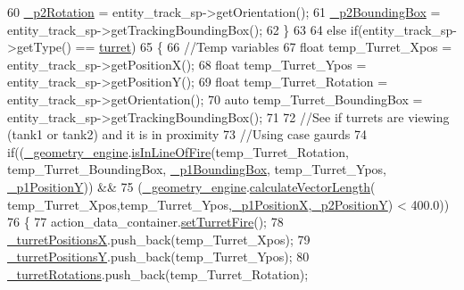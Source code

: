\begin{DoxyCode}
60                 \hyperlink{classTrackingManager_a04442a7d5e399370637c9e334a257eb6}{\_p2Rotation} = entity\_track\_sp->getOrientation();
61                 \hyperlink{classTrackingManager_a345399f12e52bc4b23786fe73b26a6ff}{\_p2BoundingBox} = entity\_track\_sp->getTrackingBoundingBox();
62             \}
63 
64             \textcolor{keywordflow}{else} \textcolor{keywordflow}{if}(entity\_track\_sp->getType() == \hyperlink{Structures_8h_a6d8f83e710b27d4f86c45f0bb77066e3a85c730ac9ffc13ac94e6e860579928a1}{turret})
65             \{
66                 \textcolor{comment}{//Temp variables}
67                 \textcolor{keywordtype}{float} temp\_Turret\_Xpos = entity\_track\_sp->getPositionX();
68                 \textcolor{keywordtype}{float} temp\_Turret\_Ypos = entity\_track\_sp->getPositionY();
69                 \textcolor{keywordtype}{float} temp\_Turret\_Rotation = entity\_track\_sp->getOrientation();
70                 \textcolor{keyword}{auto} temp\_Turret\_BoundingBox = entity\_track\_sp->getTrackingBoundingBox();
71 
72                 \textcolor{comment}{//See if turrets are viewing (tank1 or tank2) and it is in proximity}
73                 \textcolor{comment}{//Using case gaurds}
74                 \textcolor{keywordflow}{if}((\hyperlink{classTrackingManager_a9bf3e308977ec91b61c7bf5d269f35dd}{\_geometry\_engine}.\hyperlink{classGeometryEngine_af21c9c2e172169130af88fa6f3aa5fe7}{isInLineOfFire}(temp\_Turret\_Rotation, 
      temp\_Turret\_BoundingBox, \hyperlink{classTrackingManager_a4916085aebb34a3921f3592d7ae07767}{\_p1BoundingBox}, temp\_Turret\_Ypos, 
      \hyperlink{classTrackingManager_aa5b384a370b1ddccf76badc8a55459b1}{\_p1PositionY})) &&
75                    (\hyperlink{classTrackingManager_a9bf3e308977ec91b61c7bf5d269f35dd}{\_geometry\_engine}.\hyperlink{classGeometryEngine_a99634c40d20ab72ab30289a6ff4abe39}{calculateVectorLength}(
      temp\_Turret\_Xpos,temp\_Turret\_Ypos,\hyperlink{classTrackingManager_a14b43a5e0cd605fff6b3308d0377f697}{\_p1PositionX},\hyperlink{classTrackingManager_ad4d803802447b6c8a1a09104263fd829}{\_p2PositionY}) < 400.0))
76                 \{
77                     action\_data\_container.\hyperlink{classActionData_a30502665240f4a0b0e37fbcd6447b590}{setTurretFire}();
78                     \hyperlink{classTrackingManager_ad66641438bdcf33e772ef4ec1cdc7e14}{\_turretPositionsX}.push\_back(temp\_Turret\_Xpos);
79                     \hyperlink{classTrackingManager_aaf2aa5d29aa7a7abd3a7e7f27bff7340}{\_turretPositionsY}.push\_back(temp\_Turret\_Ypos);
80                     \hyperlink{classTrackingManager_adce9702d80c3554e7a359a145a6d2632}{\_turretRotations}.push\_back(temp\_Turret\_Rotation);

\end{DoxyCode}
